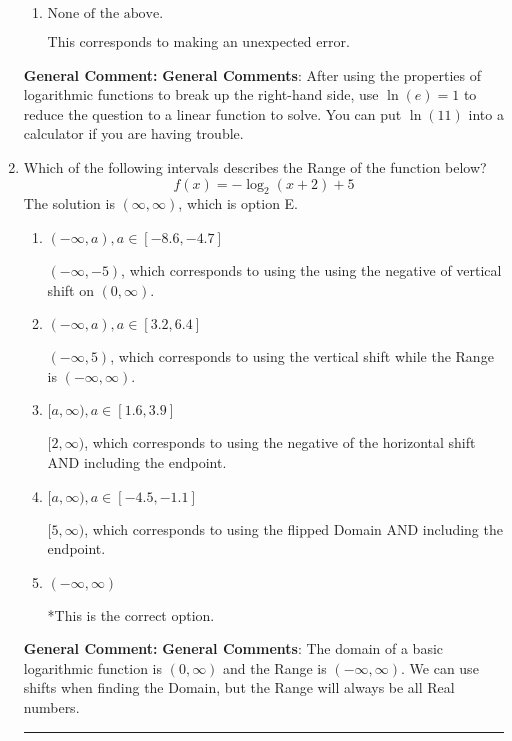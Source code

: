 \documentclass{extbook}[14pt]
\newcommand{\litem}[1]{\item #1

\rule{\textwidth}{0.4pt}}
\begin{document}
\begin{enumerate}
{\begin{enumerate}[label=\Alph*.]
This corresponds to believing you cannot solve the equation.
\item \( \text{None of the above.} \)

This corresponds to making an unexpected error.
\end{enumerate}

\textbf{General Comment:} \textbf{General Comments}: After using the properties of logarithmic functions to break up the right-hand side, use $\ln(e) = 1$ to reduce the question to a linear function to solve. You can put $\ln(11)$ into a calculator if you are having trouble.
}
\litem{
Which of the following intervals describes the Range of the function below?
\[ f(x) = -\log_2{(x+2)}+5 \]The solution is \( (\infty, \infty) \), which is option E.\begin{enumerate}[label=\Alph*.]
\item \( (-\infty, a), a \in [-8.6, -4.7] \)

$(-\infty, -5)$, which corresponds to using the using the negative of vertical shift on $(0, \infty)$.
\item \( (-\infty, a), a \in [3.2, 6.4] \)

$(-\infty, 5)$, which corresponds to using the vertical shift while the Range is $(-\infty, \infty)$.
\item \( [a, \infty), a \in [1.6, 3.9] \)

$[2, \infty)$, which corresponds to using the negative of the horizontal shift AND including the endpoint.
\item \( [a, \infty), a \in [-4.5, -1.1] \)

$[5, \infty)$, which corresponds to using the flipped Domain AND including the endpoint.
\item \( (-\infty, \infty) \)

*This is the correct option.
\end{enumerate}

\textbf{General Comment:} \textbf{General Comments}: The domain of a basic logarithmic function is $(0, \infty)$ and the Range is $(-\infty, \infty)$. We can use shifts when finding the Domain, but the Range will always be all Real numbers.
}
\end{enumerate}
\end{document}
